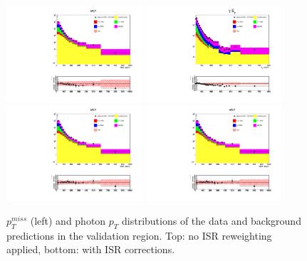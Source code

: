 \documentclass[thesis.tex]{subfiles}
\renewcommand\_{\textunderscore\allowbreak}
\begin{document}
\begin{figure}[hbtp]
  \centering
    \includegraphics[width=0.45\textwidth]{Figures/VALIDNOCOR_mg_2016ReMiniAOD_met.pdf}
    \includegraphics[width=0.45\textwidth]{Figures/VALIDNOCOR_mg_2016ReMiniAOD_pt.pdf} \\
    \includegraphics[width=0.45\textwidth]{Figures/VALID_mg_2016ReMiniAOD_met.pdf}
    \includegraphics[width=0.45\textwidth]{Figures/VALID_mg_2016ReMiniAOD_met.pdf}
  \caption{$p_T^{miss}$ (left) and photon $p_T$ distributions of the data and background predictions in the validation region. Top: no ISR reweighting applied, bottom: with ISR corrections. }
  \label{fig:apen-withcorr}
\end{figure}
\end{document}
